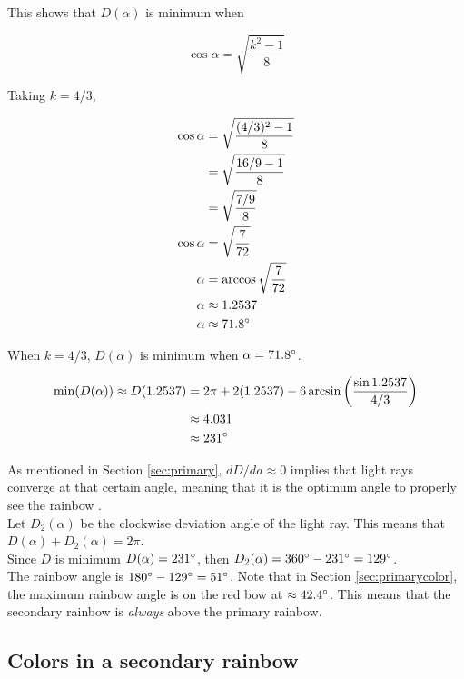\documentclass[a4paper,12pt]{article}
\begin{document}
This shows that $D(\alpha)$ is minimum when 

\begin{equation}
\cos \alpha = \sqrt{\frac{k^2-1}{8}}
\end{equation}

Taking $k = 4/3$,

\begin{align*}
\cos \alpha &= \sqrt{\frac{(4/3)^2-1}{8}}\\
&= \sqrt{\frac{16/9-1}{8}}\\
&= \sqrt{\frac{7/9}{8}}\\
\cos \alpha &= \sqrt{\frac{7}{72}}\\
\alpha &= \arccos \sqrt{\frac{7}{72}}\\
\alpha &\approx 1.2537\\
\alpha &\approx 71.8 \degree\\
\end{align*}

When $k=4/3$, $D(\alpha)$ is minimum when $\alpha = 71.8 \degree$.

\begin{align*}
\min(D(\alpha)) \approx D(1.2537) &= 2\pi + 2(1.2537) - 6 \arcsin \left( \frac{\sin 1.2537}{4/3} \right)\\
&\approx 4.031\\
&\approx 231 \degree\\
\end{align*}

As mentioned in Section \ref{sec:primary}, $dD/da \approx 0$ implies that light rays converge at that certain angle, meaning that it is the optimum angle to properly see the rainbow \cite[219]{stewart21}.\\

Let $D_2(\alpha)$ be the clockwise deviation angle of the light ray. This means that $D(\alpha) + D_2(\alpha) = 2\pi$.\\

Since $D$ is minimum $D(\alpha) = 231\degree$, then $D_2(\alpha) = 360\degree - 231\degree = 129 \degree$.\\

The rainbow angle is $180 \degree - 129\degree = 51\degree$. Note that in Section \ref{sec:primarycolor}, the maximum rainbow angle is on the red bow at $\approx 42.4 \degree$. This means that the secondary rainbow is {\itshape always} above the primary rainbow.

\subsection{Colors in a secondary rainbow}
\end{document}
